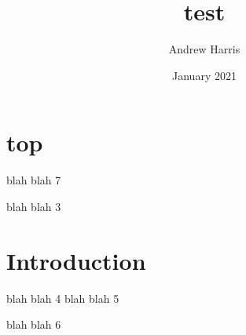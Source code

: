 \documentclass{article}
\title{test}
\author{Andrew Harris}
\date{January 2021}
\begin{document}
\maketitle
\section{top} 
blah blah 7

blah blah 3



\section{Introduction}
blah blah 4
blah blah 5

blah blah 6
\end{document}
